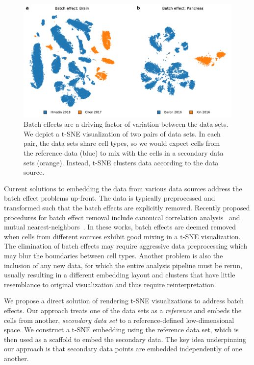 \documentclass[runningheads]{llncs}
\begin{document}
\begin{figure}[htbp]
  \includegraphics[width=\textwidth]{batch_effect.pdf}
  \caption{Batch effects are a driving factor of variation between the data
  sets. We depict a t-SNE visualization of two pairs of data sets. In each
  pair, the data sets share cell types, so we would expect cells
  from the reference data (blue) to mix with the cells in a secondary data
  sets (orange). Instead, t-SNE clusters data according to the
  data source.}
  \label{fig:batch_effect}
\end{figure}

Current solutions to embedding the data from various data sources address the
batch effect problems up-front. The data is typically preprocessed and
transformed such that the batch effects are explicitly removed. Recently
proposed procedures for batch effect removal include canonical correlation
analysis~\cite{Butler2018} and mutual nearest-neighbors~\cite{Haghverdi2018,Stuart2019}.  In these
works, batch effects are deemed removed when cells from different sources
exhibit good mixing in a t-SNE visualization.  The elimination of batch effects
may require aggressive data preprocessing which may blur the boundaries between
cell types. Another problem is also the inclusion of any new data, for which
the entire analysis pipeline must be rerun, usually resulting in a different
embedding layout and clusters that have little resemblance to original visualization and
thus require reinterpretation.

We propose a direct solution of rendering t-SNE visualizations to address
batch effects. Our approach treats one of the data sets as a {\em reference}
and embeds the cells from another, {\em secondary data set} to a reference-defined
low-dimensional space.  We construct a t\nobreakdash -SNE embedding using the
reference data set, which is then used as a scaffold to embed the
secondary data. The key idea underpinning our approach is that secondary data
points are embedded independently of one another.
\end{document}
